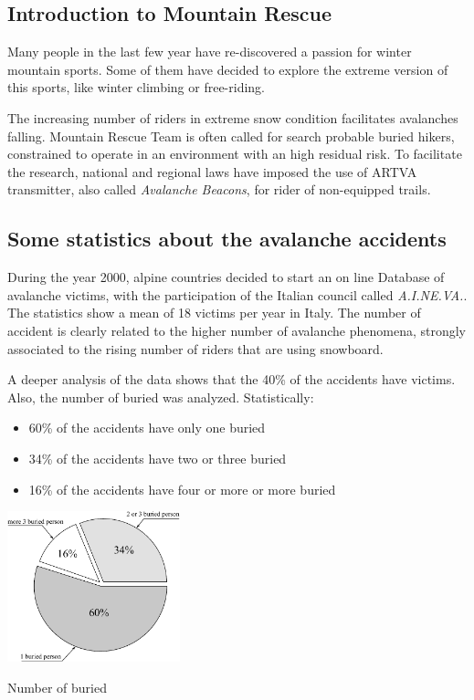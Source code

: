 
\begin{fullwidth}
\chapter{Introduction to Mountain Rescue \label{ch:chapter1}}
\end{fullwidth}
\minitoc

Many people in the last few year have re-discovered a passion for winter mountain sports. Some of them have decided to explore the extreme version of this sports, like winter climbing or free-riding.

The increasing number of riders in extreme snow condition facilitates avalanches falling. Mountain Rescue Team is often called for search probable buried hikers, constrained to operate in an environment with an high residual risk. To facilitate the research, national and regional laws\cite{ARTVAobbligationLaw} have imposed the use of ARTVA transmitter, also called \emph{Avalanche Beacons}, for rider of non-equipped trails.

\section{Some statistics about the avalanche accidents}

During the year 2000, alpine countries decided to start an on line Database of avalanche victims, with the participation of the Italian council called \emph{A.I.NE.VA.}. The statistics show a mean of 18 victims per year in Italy. The number of accident is clearly related to the higher number of avalanche phenomena, strongly associated to the rising number of riders that are using snowboard. 

A deeper analysis of the data shows that the 40\% of the accidents have victims. Also, the number of buried was analyzed. Statistically:
\begin{itemize}
\item 60\% of the accidents have only one buried 
\item 34\% of the accidents have two or three buried 
\item 16\% of the accidents have four or more or more buried
\end{itemize}
\begin{marginfigure}
	\centering
	\includegraphics[width=5cm]{ch1/img/statistiche_sepolti.pdf}
	\caption{Number of buried}
\end{marginfigure}

